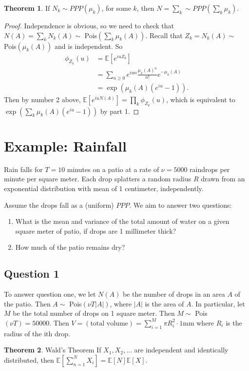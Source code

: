 \documentclass[12pt,letterpaper]{article}
\theoremstyle{definition}
\newtheorem{thm}{Theorem}[section]
\begin{document}
	\begin{thm}
		If $N_k \sim PPP(\mu_k)$, for some $k$, then $N = \sum_{k} \sim PPP(\sum_k\mu_k)$. 
	\end{thm}

	\begin{proof}
		Independence is obvious, so we need to check that $N(A) = \sum_k N_k(A) \sim$ Pois$\left(\sum_k \mu_k(A)\right)$. Recall that $Z_k = N_k(A) \sim $ Pois$\left(\mu_k(A)\right)$ and is independent. So \begin{align*}\phi_{Z_k}(u) &= \mathbb{E}[e^{iuZ_k}] \\
		&= \sum_{n \geq 0} e^{iun} \frac{\mu_k(A)^n}{n!} e^{-\mu_k(A)} \\
		&= \exp(\mu_k(A)(e^{iu} - 1)).\end{align*} Then by number 2 above, $\mathbb{E}[e^{iuN(A)}] = \prod_k \phi_{Z_k}(u)$, which is equivalent to $\exp(\sum_k \mu_k(A)(e^{iu} - 1))$ by part 1. 
	\end{proof}

	\section{Example: Rainfall}
	Rain falls for $T= 10$ minutes on a patio at a rate of $\nu = 5000$ raindrops per minute per square meter. Each drop splatters a random radius $R$ drawn from an exponential distribution with mean of 1 centimeter, independently. 
	
	Assume the drops fall as a (uniform) $PPP$. We aim to answer two questions: \begin{enumerate}
		\item What is the mean and variance of the total amount of water on a given square meter of patio, if drops are 1 millimeter thick?
		\item How much of the patio remains dry?
	\end{enumerate}
\subsection{Question 1}
	To answer question one, we let $N(A)$ be the number of drops in an area $A$ of the patio. Then $A \sim $ Pois$(\nu T |A|)$, where $|A|$ is the area of $A$. In particular, let $M$ be the total number of drops on 1 square meter. Then $M \sim $ Pois$(\nu T) = 50000$. Then $V = (\text{total volume}) = \sum_{i=1}^M \pi R^2_i \cdot 1$mm where $R_i$ is the radius of the ith drop.  
	
	\begin{thm}{Wald's Theorem}
		If $X_1, X_2, \ldots $ are independent and identically distributed, then $\mathbb{E}[\sum_{n=1}^N X_i] = \mathbb{E}[{N}]\mathbb{E}[{X}]$. 
	\end{thm}
\end{document}
